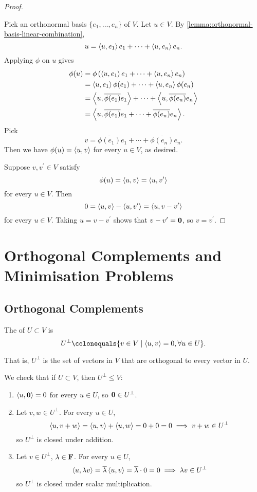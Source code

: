 \begin{proof} \

 Pick an orthonormal basis $\{e_1,\dots,e_n\}$ of $V$. 
Let $u\in V$. By \ref{lemma:orthonormal-basis-linear-combination}, 
\[u=\left\langle u,e_1\right\rangle e_1+\cdots+\left\langle u,e_n\right\rangle e_n.\]
Applying $\phi$ on $u$ gives
\begin{align*}
\phi(u)&=\phi\left(\left\langle u,e_1\right\rangle e_1+\cdots+\left\langle u,e_n\right\rangle e_n\right)\\
&=\left\langle u,e_1\right\rangle\phi(e_1)+\cdots+\left\langle u,e_n\right\rangle\phi(e_n)\\
&=\left\langle u,\overline{\phi(e_1)}e_1\right\rangle+\cdots+\left\langle u,\overline{\phi(e_n)}e_n\right\rangle\\
&=\left\langle u,\overline{\phi(e_1)}e_1+\cdots+\overline{\phi(e_n)}e_n\right\rangle.
\end{align*}
Pick
\[v=\overline{\phi(e_1)}e_1+\cdots+\overline{\phi(e_n)}e_n.\]
Then we have $\phi(u)=\left\langle u,v\right\rangle$ for every $u\in V$, as desired.

 Suppose $v,v^\prime\in V$ satisfy
\[\phi(u)=\left\langle u,v\right\rangle=\left\langle u,v^\prime\right\rangle\]
for every $u\in V$. Then
\[0=\left\langle u,v\right\rangle-\left\langle u,v^\prime\right\rangle=\left\langle u,v-v^\prime\right\rangle\]
for every $u\in V$. Taking $u=v-v^\prime$ shows that $v-v^\prime=\vb{0}$, so $v=v^\prime$.
\end{proof}
\pagebreak

\section{Orthogonal Complements and Minimisation Problems}
\subsection{Orthogonal Complements}
\begin{definition}
The  of $U\subset V$ is
\[U^\perp\colonequals\{v\in V\mid\angbrac{u,v}=0,\forall u\in U\}.\]
\end{definition}

That is, $U^\perp$ is the set of vectors in $V$ that are orthogonal to every vector in $U$.

We check that if $U\subset V$, then $U^\perp\le V$:
\begin{enumerate}[label=(\roman*)]
\item $\left\langle u,\vb{0}\right\rangle=0$ for every $u\in U$, so $\vb{0}\in U^\perp$.
\item Let $v,w\in U^\perp$. For every $u\in U$,
\[\left\langle u,v+w\right\rangle=\left\langle u,v\right\rangle+\left\langle u,w\right\rangle=0+0=0\implies v+w\in U^\perp\]
so $U^\perp$ is closed under addition.
\item Let $v\in U^\perp$, $\lambda\in\mathbf F$. For every $u\in U$,
\[\left\langle u,\lambda v\right\rangle=\overline{\lambda}\left\langle u,v\right\rangle=\overline{\lambda}\cdot0=0\implies\lambda v\in U^\perp\]
so $U^\perp$ is closed under scalar multiplication.
\end{enumerate}

